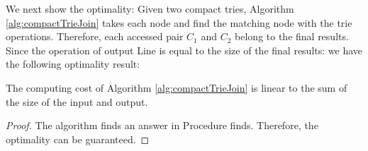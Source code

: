 We next show the optimality: Given two compact tries, Algorithm \ref{alg:compactTrieJoin} takes each node and find the  matching node with the trie operations. Therefore, each accessed pair $C_1$ and $C_2$ belong to the final results. Since the operation of output Line is equal to the size of the final results: we have the following optimality result:

\begin{theorem}   The computing cost of Algorithm \ref{alg:compactTrieJoin} is linear to the sum of the size of the input and output. \label{theo:optimality_compactTrie}
\end{theorem}

\begin{proof}  The algorithm finds an answer in Procedure finds. Therefore, the optimality can be guaranteed.
\end{proof}


